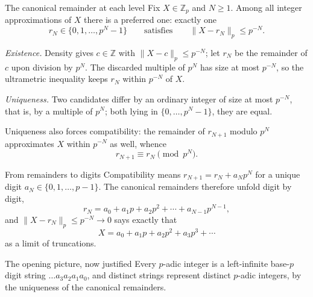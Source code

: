 \documentclass[aspectratio=169,11pt]{beamer}
\newcommand{\Z}{\mathbb Z}
\begin{document}
\begin{frame}{The canonical remainder at each level}
  \small
  Fix \(X\in\Z_p\) and \(N\ge1\).  Among all integer approximations of
  \(X\) there is a preferred one: exactly one
  \[
    r_N\in\{0,1,\ldots,p^N-1\}
    \qquad\text{satisfies}\qquad
    \|X-r_N\|_p\le p^{-N}.
  \]

  \emph{Existence.}  Density gives \(c\in\Z\) with \(\|X-c\|_p\le p^{-N}\);
  let \(r_N\) be the remainder of \(c\) upon division by \(p^N\).  The
  discarded multiple of \(p^N\) has size at most \(p^{-N}\), so the
  ultrametric inequality keeps \(r_N\) within \(p^{-N}\) of \(X\).

  \emph{Uniqueness.}  Two candidates differ by an ordinary integer of size
  at most \(p^{-N}\), that is, by a multiple of \(p^N\); both lying in
  \(\{0,\ldots,p^N-1\}\), they are equal.

  Uniqueness also forces \alert{compatibility}: the remainder of
  \(r_{N+1}\) modulo \(p^N\) approximates \(X\) within \(p^{-N}\) as well,
  whence
  \[
    \boxed{r_{N+1}\equiv r_N\pmod{p^N}.}
  \]
\end{frame}

\begin{frame}{From remainders to digits}
  Compatibility means \(r_{N+1}=r_N+a_Np^N\) for a unique digit
  \(a_N\in\{0,1,\ldots,p-1\}\).  The canonical remainders therefore unfold
  digit by digit,
  \[
    r_N=a_0+a_1p+a_2p^2+\cdots+a_{N-1}p^{N-1},
  \]
  and \(\|X-r_N\|_p\le p^{-N}\longrightarrow0\) says exactly that
  \[
    \boxed{X=a_0+a_1p+a_2p^2+a_3p^3+\cdots}
  \]
  as a limit of truncations.

  \begin{alertblock}{The opening picture, now justified}
    Every \(p\)-adic integer is a left-infinite base-\(p\) digit string
    \(\ldots a_3a_2a_1a_0\), and distinct strings represent distinct
    \(p\)-adic integers, by the uniqueness of the canonical remainders.
  \end{alertblock}
\end{frame}
\end{document}
